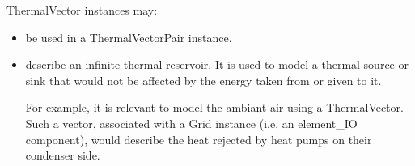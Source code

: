 \documentclass[letterpaper,10pt,english]{sphinxmanual}
\begin{document}
\begin{fulllineitems}
\label{\detokenize{generated/tamos.element.ThermalVector:tamos.element.ThermalVector}}
\pysigstartsignatures
{}
\pysigstopsignatures{}

\begin{fulllineitems}
\label{\detokenize{generated/tamos.element.ThermalVector:tamos.element.ThermalVector.__init__}}
\pysigstartsignatures
{}
\pysigstopsignatures
\sphinxAtStartPar
ThermalVector instances may:
\begin{itemize}
\item {} 
\sphinxAtStartPar
be used in a ThermalVectorPair instance.

\item {} 
\sphinxAtStartPar
describe an infinite thermal reservoir.
It is used to model a thermal source or sink that would not be affected by the energy taken from or given to it.

\begin{sphinxVerbatim}[commandchars=\\\{\}]
\end{sphinxVerbatim}

\sphinxAtStartPar
For example, it is relevant to model the ambiant air using a ThermalVector. Such a vector, associated with
a Grid instance (i.e. an element\_IO component), would describe the heat rejected by heat pumps on their condenser side.

\begin{sphinxVerbatim}[commandchars=\\\{\}]
 
\end{sphinxVerbatim}


\end{itemize}
\end{fulllineitems}
\end{fulllineitems}
\end{document}
